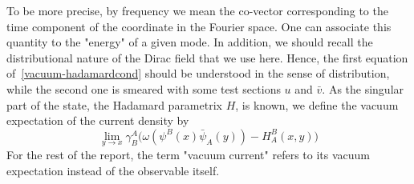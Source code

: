 To be more precise, 
by frequency we mean the co-vector corresponding to the time component of the coordinate in the Fourier space.
One can associate this quantity to the "energy" of a given mode. 
In addition, we should recall the distributional nature of the Dirac field that we use here. 
Hence, the first equation of~\cref{vacuum-hadamardcond} should be understood in the sense of distribution,
while the second one is smeared with some test sections $u$ and $\bar{v}$. 
As the singular part of the state, the Hadamard parametrix $H$, is known, we define the vacuum expectation of the current density by 
\begin{equation}\label{vacuum-currentexpression}
\lim_{y \rightarrow x} \gamma^A_B \big(
\omega(\psi^B(x)\bar{\psi}_A(y)) - H^B_A (x, y)\big)
\end{equation}
For the rest of the report, the term "vacuum current" refers to its vacuum expectation instead of the observable itself. 
%
